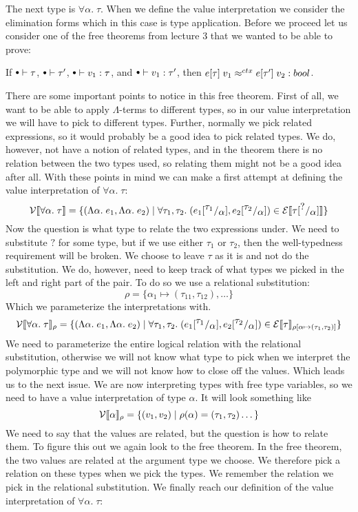 The next type is $\forall \alpha. \; \tau$. When we define the value interpretation we consider the elimination forms which in this case is type application. Before we proceed let us consider one of the free theorems from lecture 3 that we wanted to be able to prove:
\begin{theorem}
  If $\mtenv \vdash \tau$, 
  $\mtenv \vdash \tau'$, 
  $\mtenv \vdash v_1 : \tau$, 
  and $\mtenv \vdash v_1 : \tau'$, 
  then $\ctxeq{e[\tau]\; v_1}{e[\tau']\; v_2} : bool$.
\end{theorem}
There are some important points to notice in this free theorem. First of all, we want to be able to apply $\Lambda$-terms to different types, so in our value interpretation we will have to pick to different types. Further, normally we pick related expressions, so it would probably be a good idea to pick related types. We do, however, not have a notion of related types, and in the theorem there is no relation between the two types used, so relating them might not be a good idea after all. With these points in mind we can make a first attempt at defining the value interpretation of $\forall \alpha. \; \tau$:
\[
  \vpred{\forall \alpha. \; \tau} = \{(\tLabs{e_1}, \tLabs{e_2}) \vbar \forall \tau_1,\tau_2. \; (\subst{e_1}{\tau_1}{\alpha},\subst{e_2}{\tau_2}{\alpha}) \in \epred{\subst{\tau}{?}{\alpha}} \}
  \]
Now the question is what type to relate the two expressions under. We need to substitute $?$ for some type, but if we use either $\tau_1$ or $\tau_2$, then the well-typedness requirement will be broken. We choose to leave $\tau$ as it is and not do the substitution. We do, however, need to keep track of what types we picked in the left and right part of the pair. To do so we use a relational substitution:
\[
  \rho = \{ \alpha_1 \mapsto (\tau_{11},\tau_{12} ), \dots \}
\]
Which we parameterize the interpretations with.
\[
  \vprep{\forall \alpha.\; \tau} = \{(\tLabs{e_1},\tLabs{e_2}) \vbar \forall \tau_1 , \tau_2. \; (\subst{e_1}{\tau_1}{\alpha},\subst{e_2}{\tau_2}{\alpha}) \in \eprep[\extsub{\rho}{\alpha}{(\tau_1,\tau_2)}]{\tau} \}
\]
We need to parameterize the entire logical relation with the relational substitution, otherwise we will not know what type to pick when we interpret the polymorphic type and we will not know how to close off the values. Which leads us to the next issue. We are now interpreting types with free type variables, so we need to have a value interpretation of type $\alpha$. It will look something like
\[
\vprep{\alpha} = \{(v_1,v_2) \vbar \rho(\alpha) = (\tau_1,\tau_2) \dots\}
\]
We need to say that the values are related, but the question is how to relate them. To figure this out we again look to the free theorem. In the free theorem, the two values are related at the argument type we choose. We therefore pick a relation on these types when we pick the types. We remember the relation we pick in the relational substitution. We finally reach our definition of the value interpretation of $\forall \alpha. \; \tau$:
